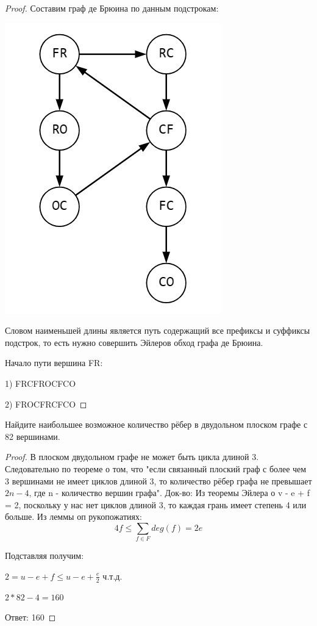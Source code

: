 \begin{proof}
    Составим граф де Брюина по данным подстрокам:
    
    \includegraphics[width=0.35\linewidth]{pics/6thGraph.png}

    Словом наименьшей длины является путь содержащий все префиксы и суффиксы подстрок, то есть нужно совершить Эйлеров обход графа де Брюина.
    
    Начало пути вершина FR:
    
    1) FRCFROCFCO
    
    2) FROCFRCFCO 
    
\end{proof}

\begin{problem}[7]

	Найдите наибольшее возможное количество рёбер в двудольном плоском графе с 82 вершинами.
    
\end{problem}

\begin{proof}

    В плоском двудольном графе не может быть цикла длиной 3. Следовательно по теореме о том, что "если связанный плоский граф с более чем 3 вершинами не имеет циклов длиной 3, то количество рёбер графа не превышает $2n-4$, где n - количество вершин графа".
    Док-во:
    Из теоремы Эйлера о v - e + f = 2, поскольку у нас нет циклов длиной 3, то каждая грань имеет степень 4 или больше. Из леммы оп рукопожатиях:
    \[4f\leqslant\sum\limits_{f\in{F}}deg(f)=2e\]

    Подставляя получим:

    $2=u-e+f\leqslant u-e+\frac{e}{2}$ ч.т.д.
    
    $2*82-4=160$

    Ответ: 160

\end{proof}

